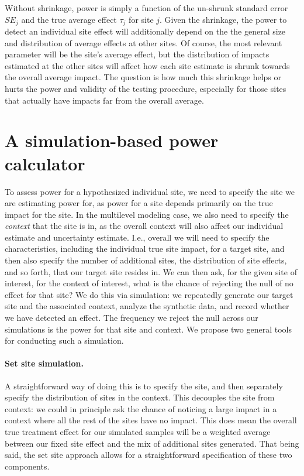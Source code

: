 \documentclass[]{article}
\begin{document}
Without shrinkage, power is simply a function of the un-shrunk standard error $SE_j$ and the true average effect $\tau_j$ for site $j$.
Given the shrinkage, the power to detect an individual site effect will additionally depend on the  the general size and distribution of average effects at other sites.
Of course, the most relevant parameter will be the site's average effect, but the distribution of impacts estimated at the other sites will affect how each site estimate is shrunk towards the overall average impact.
The question is how much this shrinkage helps or hurts the power and validity of the testing procedure, especially for those sites that actually have impacts far from the overall average.


\section{A simulation-based power calculator}

To assess power for a hypothesized individual site, we need to specify the site we are estimating power for, as power for a site depends primarily on the true impact for the site.
In the multilevel modeling case, we also need to specify the \emph{context} that the site is in, as the overall context will also affect our individual estimate and uncertainty estimate.
I.e., overall we will need to specify the characteristics, including the individual true site impact, for a target site, and then also specify the number of additional sites, the distribution of site effects, and so forth, that our target site resides in.
We can then ask, for the given site of interest, for the context of interest, what is the chance of rejecting the null of no effect for that site?
We do this via simulation: we repeatedly generate our target site and the associated context, analyze the synthetic data, and record whether we have detected an effect.
The frequency we reject the null across our simulations is the power for that site and context.
We propose two general tools for conducting such a simulation.


\paragraph{Set site simulation.} A straightforward way of doing this is to specify the site, and then separately specify the distribution of sites in the context.
This decouples the site from context: we could in principle ask the chance of noticing a large impact in a context where all the rest of the sites have no impact.
This does mean the overall true treatment effect for our simulated samples will be a weighted average between our fixed site effect and the mix of additional sites generated.
That being said, the set site approach allows for a straightforward specification of these two components.
\end{document}
